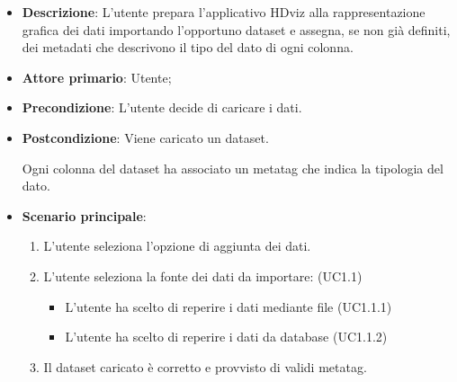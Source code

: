 \begin{itemize}
    \item \textbf{Descrizione}: L'utente prepara l'applicativo HDviz alla rappresentazione
                                grafica dei dati importando l'opportuno dataset e assegna, 
                                se non già definiti, dei metadati 
                                che descrivono il tipo del dato di ogni colonna.
	
    \item \textbf{Attore primario}: Utente;
    
    \item \textbf{Precondizione}:   L'utente decide di caricare i dati.

    \item \textbf{Postcondizione}:  Viene caricato un dataset. 
    
                                    Ogni colonna del dataset ha associato
                                    un metatag che indica la tipologia del dato.

	\item \textbf{Scenario principale}:
		\begin{enumerate}
			\item L'utente seleziona l'opzione di aggiunta dei dati.
            \item L'utente seleziona la fonte dei dati da importare: (UC1.1)
            \begin{itemize}
                \item L'utente ha scelto di reperire i dati mediante file (UC1.1.1)
                \item L'utente ha scelto di reperire i dati da database (UC1.1.2)
            \end{itemize}
            \item Il dataset caricato è corretto e provvisto di validi metatag.
        \end{enumerate}
   

\end{itemize}
